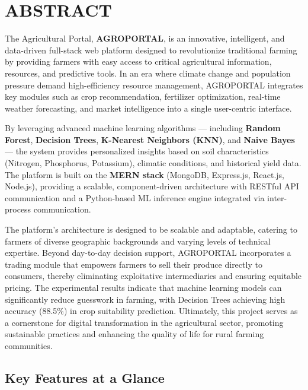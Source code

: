 \documentclass[12pt,a4paper]{report}
\begin{document}
\newpage

\section{ABSTRACT}

The Agricultural Portal, \textbf{AGROPORTAL}, is an innovative, intelligent, and data-driven full-stack web platform designed to revolutionize traditional farming by providing farmers with easy access to critical agricultural information, resources, and predictive tools. In an era where climate change and population pressure demand high-efficiency resource management, AGROPORTAL integrates key modules such as crop recommendation, fertilizer optimization, real-time weather forecasting, and market intelligence into a single user-centric interface.

By leveraging advanced machine learning algorithms — including \textbf{Random Forest}, \textbf{Decision Trees}, \textbf{K-Nearest Neighbors (KNN)}, and \textbf{Naive Bayes} — the system provides personalized insights based on soil characteristics (Nitrogen, Phosphorus, Potassium), climatic conditions, and historical yield data. The platform is built on the \textbf{MERN stack} (MongoDB, Express.js, React.js, Node.js), providing a scalable, component-driven architecture with RESTful API communication and a Python-based ML inference engine integrated via inter-process communication.

The platform's architecture is designed to be scalable and adaptable, catering to farmers of diverse geographic backgrounds and varying levels of technical expertise. Beyond day-to-day decision support, AGROPORTAL incorporates a trading module that empowers farmers to sell their produce directly to consumers, thereby eliminating exploitative intermediaries and ensuring equitable pricing. The experimental results indicate that machine learning models can significantly reduce guesswork in farming, with Decision Trees achieving high accuracy (88.5\%) in crop suitability prediction. Ultimately, this project serves as a cornerstone for digital transformation in the agricultural sector, promoting sustainable practices and enhancing the quality of life for rural farming communities.

\newpage

\subsection{Key Features at a Glance}
\end{document}
